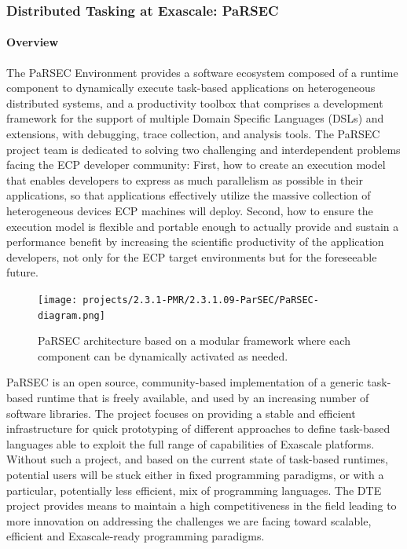 \subsubsection{ Distributed Tasking at Exascale: PaRSEC}


\paragraph{Overview}

The PaRSEC Environment provides a software ecosystem composed of a runtime
component to dynamically execute task-based applications on heterogeneous
distributed systems, and a productivity toolbox that comprises a development
framework for the support of multiple Domain Specific Languages (DSLs) and
extensions, with debugging, trace collection, and analysis tools.
%
The PaRSEC project team is dedicated to solving two challenging and
interdependent problems facing the ECP developer community: First, how to create
an execution model that enables developers to express as much parallelism as
possible in their applications, so that applications effectively utilize the
massive collection of heterogeneous devices ECP machines will deploy. Second,
how to ensure the execution model is flexible and portable enough to actually
provide and sustain a performance benefit by increasing the scientific
productivity of the application developers, not only for the ECP target
environments but for the foreseeable future.

\begin{figure}
\texttt{[image: projects/2.3.1-PMR/2.3.1.09-ParSEC/PaRSEC-diagram.png]}
\caption{PaRSEC architecture\label{fig:parsec} based on a modular framework where each
component can be dynamically activated as needed.}
\end{figure}
%
PaRSEC is an open source, community-based implementation of a generic task-based
runtime that is freely available, and used by an increasing number of software
libraries.
The project focuses on providing a stable and efficient infrastructure for quick
prototyping of different approaches to define task-based languages able to
exploit the full range of capabilities of Exascale platforms. Without such a
project, and based on the current state of task-based runtimes, potential users
will be stuck either in fixed programming paradigms, or with a particular,
potentially less efficient, mix of programming languages. The DTE project
provides means to maintain a high competitiveness in the field leading to more
innovation on addressing the challenges we are facing toward scalable,
efficient and Exascale-ready programming paradigms.


